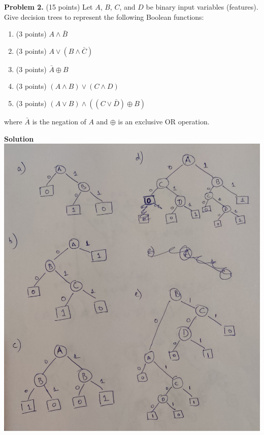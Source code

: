 \documentclass[twoside]{article}
\begin{document}
\vspace{1em}
\newpage

\textbf{Problem 2.} (15 points) Let $A$, $B$, $C$, and $D$ be binary input variables (features). Give decision trees to represent the following Boolean functions:

\begin{enumerate}
\item (3 points) $A\wedge\bar{B}$
\item (3 points) $A\vee(B\wedge\bar{C})$
\item (3 points) $\bar{A}\oplus B$
\item (3 points) $(A\wedge B)\vee(C\wedge D)$
\item (3 points) $(A\vee B)\wedge((C\vee\bar{D})\oplus B)$
\end{enumerate}
where $\bar{A}$ is the negation of $A$ and $\oplus$ is an exclusive OR operation.


\textbf{Solution}\\
\includegraphics[scale=0.15]{img}



\vspace{1em}
\end{document}
